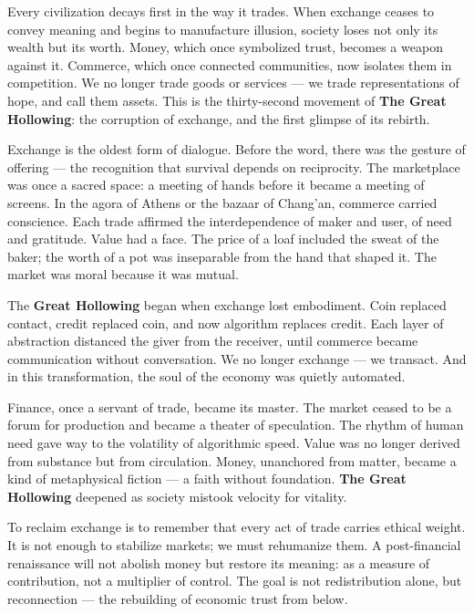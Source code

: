 \documentclass[11pt,twoside]{book}
\begin{document}
Every civilization decays first in the way it trades.  
When exchange ceases to convey meaning and begins to manufacture illusion, society loses not only its wealth but its worth.  
Money, which once symbolized trust, becomes a weapon against it.  
Commerce, which once connected communities, now isolates them in competition.  
We no longer trade goods or services — we trade representations of hope, and call them assets.  
This is the thirty-second movement of \textbf{The Great Hollowing}: the corruption of exchange, and the first glimpse of its rebirth.

\bigskip

Exchange is the oldest form of dialogue.  
Before the word, there was the gesture of offering — the recognition that survival depends on reciprocity.  
The marketplace was once a sacred space: a meeting of hands before it became a meeting of screens.  
In the agora of Athens or the bazaar of Chang’an, commerce carried conscience.  
Each trade affirmed the interdependence of maker and user, of need and gratitude.  
Value had a face.  
The price of a loaf included the sweat of the baker; the worth of a pot was inseparable from the hand that shaped it.  
The market was moral because it was mutual.

The \textbf{Great Hollowing} began when exchange lost embodiment.  
Coin replaced contact, credit replaced coin, and now algorithm replaces credit.  
Each layer of abstraction distanced the giver from the receiver, until commerce became communication without conversation.  
We no longer exchange — we transact.  
And in this transformation, the soul of the economy was quietly automated.

Finance, once a servant of trade, became its master.  
The market ceased to be a forum for production and became a theater of speculation.  
The rhythm of human need gave way to the volatility of algorithmic speed.  
Value was no longer derived from substance but from circulation.  
Money, unanchored from matter, became a kind of metaphysical fiction — a faith without foundation.  
\textbf{The Great Hollowing} deepened as society mistook velocity for vitality.

To reclaim exchange is to remember that every act of trade carries ethical weight.  
It is not enough to stabilize markets; we must rehumanize them.  
A post-financial renaissance will not abolish money but restore its meaning: as a measure of contribution, not a multiplier of control.  
The goal is not redistribution alone, but reconnection — the rebuilding of economic trust from below.
\end{document}
